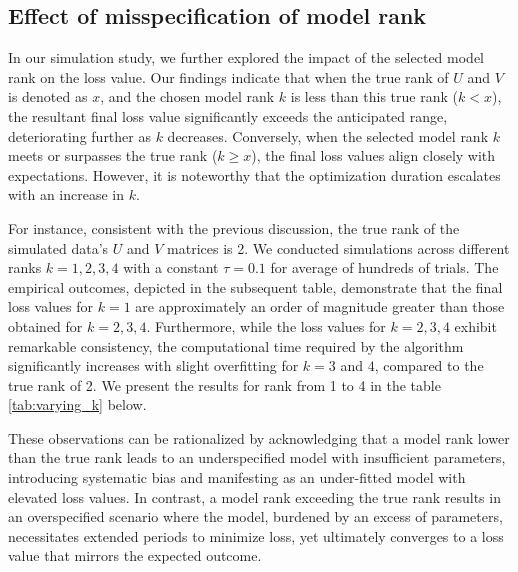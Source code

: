 \documentclass{article}
\begin{document}
\subsection{Effect of misspecification of model rank}
In our simulation study, we further explored the impact of the selected model rank on the loss value. Our findings indicate that when the true rank of $U$ and $V$ is denoted as $x$, and the chosen model rank $k$ is less than this true rank ($k < x$), the resultant final loss value significantly exceeds the anticipated range, deteriorating further as $k$ decreases. Conversely, when the selected model rank $k$ meets or surpasses the true rank ($k \geq x$), the final loss values align closely with expectations. However, it is noteworthy that the optimization duration escalates with an increase in $k$.

For instance, consistent with the previous discussion, the true rank of the simulated data's $U$ and $V$ matrices is 2. We conducted simulations across different ranks $k = 1, 2, 3, 4$ with a constant $\tau = 0.1$ for average of hundreds of trials. The empirical outcomes, depicted in the subsequent table, demonstrate that the final loss values for $k = 1$ are approximately an order of magnitude greater than those obtained for $k = 2, 3, 4$. Furthermore, while the loss values for $k = 2, 3, 4$ exhibit remarkable consistency, the computational time required by the algorithm significantly increases with slight overfitting for $k = 3$ and $4$, compared to the true rank of 2. We present the results for rank from 1 to 4 in the table \ref{tab:varying_k} below.

These observations can be rationalized by acknowledging that a model rank lower than the true rank leads to an underspecified model with insufficient parameters, introducing systematic bias and manifesting as an under-fitted model with elevated loss values. In contrast, a model rank exceeding the true rank results in an overspecified scenario where the model, burdened by an excess of parameters, necessitates extended periods to minimize loss, yet ultimately converges to a loss value that mirrors the expected outcome.
\end{document}
